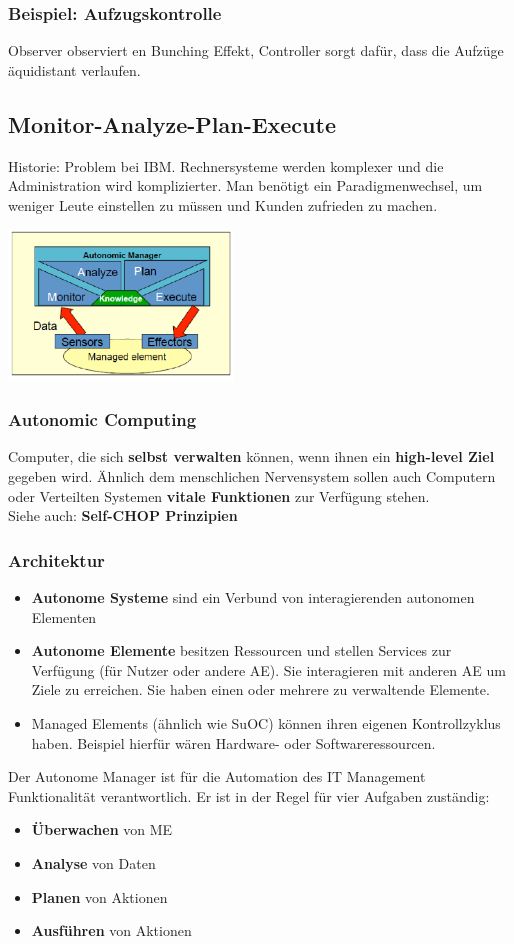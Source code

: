 \documentclass[a4paper]{article}
\begin{document}
\subsubsection{Beispiel: Aufzugskontrolle}
Observer observiert en Bunching Effekt, Controller sorgt dafür, dass die Aufzüge äquidistant verlaufen. 
\subsection{Monitor-Analyze-Plan-Execute}
Historie: Problem bei IBM. Rechnersysteme werden komplexer und die Administration wird komplizierter. Man benötigt ein Paradigmenwechsel, um weniger Leute einstellen zu müssen und Kunden zufrieden zu machen.
\begin{center}
	\includegraphics[height = 4cm]{MAPE.png}
\end{center}
\subsubsection{Autonomic Computing}
Computer, die sich \textbf{selbst verwalten} können, wenn ihnen ein \textbf{high-level Ziel} gegeben wird. Ähnlich dem menschlichen Nervensystem sollen auch Computern oder Verteilten Systemen \textbf{vitale Funktionen} zur Verfügung stehen.\\
Siehe auch: \textbf{Self-CHOP Prinzipien}
\subsubsection{Architektur}
\begin{itemize}
	\item \textbf{Autonome Systeme} sind ein Verbund von interagierenden autonomen Elementen
	\item \textbf{Autonome Elemente} besitzen Ressourcen und stellen Services zur Verfügung (für Nutzer oder andere AE). Sie interagieren mit anderen AE um Ziele zu erreichen. Sie haben einen oder mehrere zu verwaltende Elemente.
	\item Managed Elements (ähnlich wie SuOC) können ihren eigenen Kontrollzyklus haben. Beispiel hierfür wären Hardware- oder Softwareressourcen.
\end{itemize}
Der Autonome Manager ist für die Automation des IT Management Funktionalität verantwortlich. Er ist in der Regel für vier Aufgaben zuständig:
\begin{itemize}
	\item \textbf{Überwachen} von ME
	\item \textbf{Analyse} von Daten
	\item \textbf{Planen} von Aktionen
	\item \textbf{Ausführen} von Aktionen
\end{itemize}
\end{document}
